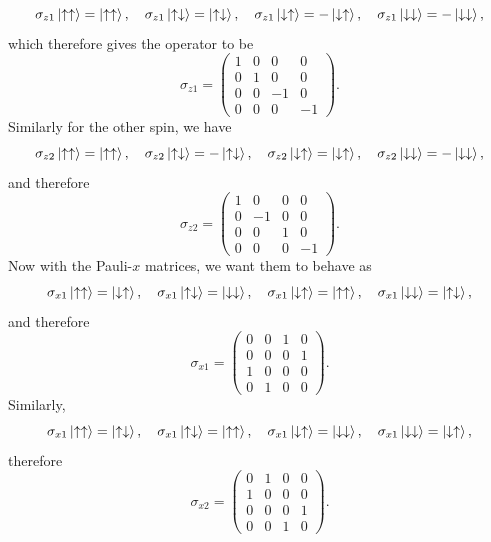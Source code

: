 \documentclass{article}
\begin{document}
\[
    \sigma _{z1}\ket{ \uparrow \uparrow}=\ket{\uparrow \uparrow},\quad\sigma _{z1}\ket{\uparrow \downarrow}=\ket{\uparrow \downarrow},\quad\sigma _{z1}\ket{\downarrow \uparrow}=-\ket{\downarrow \uparrow},\quad\sigma _{z1}\ket{\downarrow \downarrow}=-\ket{\downarrow \downarrow},
\]
which therefore gives the operator to be
\[
    \sigma _{z1}=\begin{pmatrix}
        1 & 0 & 0 & 0\\
        0 & 1 & 0 & 0\\
        0 & 0&-1 &0 \\
        0&0&0&-1
    \end{pmatrix}.
\]
Similarly for the other spin, we have
\[
    \sigma _{z2}\ket{ \uparrow \uparrow}=\ket{\uparrow \uparrow},\quad\sigma _{z2}\ket{\uparrow \downarrow}=-\ket{\uparrow \downarrow},\quad\sigma _{z2}\ket{\downarrow \uparrow}=\ket{\downarrow \uparrow},\quad\sigma _{z2}\ket{\downarrow \downarrow}=-\ket{\downarrow \downarrow},
\]
and therefore
\[
    \sigma _{z2}=\begin{pmatrix}
        1 & 0 & 0 & 0\\
        0 & -1 & 0 & 0\\
        0 & 0&1 &0 \\
        0&0&0&-1
    \end{pmatrix}.
\]
Now with the Pauli-$x$ matrices, we want them to behave as
\[
    \sigma _{x1}\ket{\uparrow \uparrow}=\ket{\downarrow \uparrow},\quad \sigma _{x1}\ket{\uparrow \downarrow}=\ket{\downarrow \downarrow},\quad\sigma _{x1}\ket{\downarrow \uparrow}=\ket{\uparrow \uparrow},\quad\sigma _{x1}\ket{\downarrow \downarrow}=\ket{\uparrow \downarrow},
\]
and therefore
\[
    \sigma _{x1}=\begin{pmatrix}
        0&0&1&0\\
        0&0&0&1\\
        1&0&0&0\\
        0&1&0&0
    \end{pmatrix}.
\]
Similarly,
\[
    \sigma _{x1}\ket{\uparrow \uparrow}=\ket{\uparrow \downarrow},\quad \sigma _{x1}\ket{\uparrow \downarrow}=\ket{\uparrow \uparrow},\quad\sigma _{x1}\ket{\downarrow \uparrow}=\ket{\downarrow \downarrow},\quad\sigma _{x1}\ket{\downarrow \downarrow}=\ket{\downarrow \uparrow},
\]
therefore
\[
    \sigma _{x2}=\begin{pmatrix}
        0&1&0&0\\
        1&0&0&0\\
        0&0&0&1\\
        0&0&1&0
    \end{pmatrix}.
\]
\end{document}

